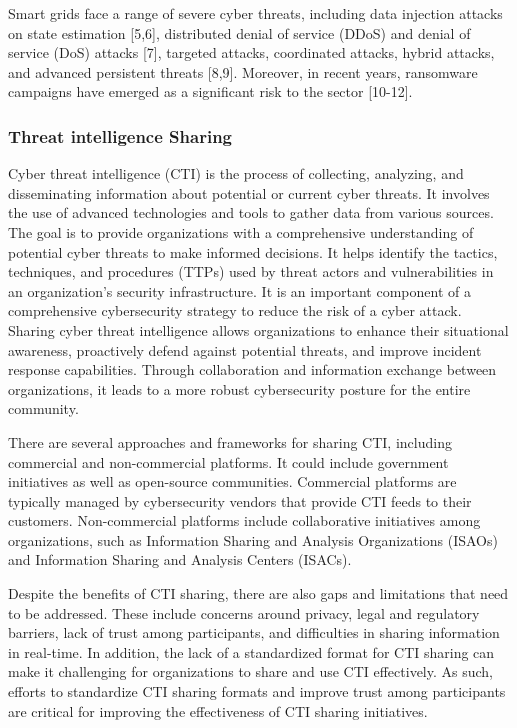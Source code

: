 \documentclass{article}
\begin{document}
Smart grids face a range of severe cyber threats, including data injection attacks on state estimation [5,6], distributed denial of service (DDoS) and denial of service (DoS) attacks [7], targeted attacks, coordinated attacks, hybrid attacks, and advanced persistent threats [8,9]. Moreover, in recent years, ransomware campaigns have emerged as a significant risk to the sector [10-12].



\subsubsection*{Threat intelligence Sharing}
Cyber threat intelligence (CTI) is the process of collecting, analyzing, and disseminating information about potential or current cyber threats. It involves the use of advanced technologies and tools to gather data from various sources. The goal is to provide organizations with a comprehensive understanding of potential cyber threats to make informed decisions. It helps identify the tactics, techniques, and procedures (TTPs) used by threat actors and vulnerabilities in an organization's security infrastructure. It is an important component of a comprehensive cybersecurity strategy to reduce the risk of a cyber attack. Sharing cyber threat intelligence allows organizations to enhance their situational awareness, proactively defend against potential threats, and improve incident response capabilities. Through collaboration and information exchange between organizations, it leads to a more robust cybersecurity posture for the entire community.

There are several approaches and frameworks for sharing CTI, including commercial and non-commercial platforms. It could include government initiatives as well as open-source communities. Commercial platforms are typically managed by cybersecurity vendors that provide CTI feeds to their customers. Non-commercial platforms include collaborative initiatives among organizations, such as Information Sharing and Analysis Organizations (ISAOs) and Information Sharing and Analysis Centers (ISACs).

Despite the benefits of CTI sharing, there are also gaps and limitations that need to be addressed. These include concerns around privacy, legal and regulatory barriers, lack of trust among participants, and difficulties in sharing information in real-time. In addition, the lack of a standardized format for CTI sharing can make it challenging for organizations to share and use CTI effectively. As such, efforts to standardize CTI sharing formats and improve trust among participants are critical for improving the effectiveness of CTI sharing initiatives.
\end{document}
